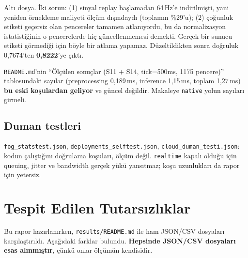 \documentclass[11pt,a4paper]{report}
\newcommand{\ms}{\,ms}
\newcommand{\kod}[1]{\texttt{\small #1}}
\newcommand{\dosya}[1]{\texttt{\footnotesize #1}}
\begin{document}
Altı dosya. İki sorun: (1) sinyal replay başlamadan 64\,Hz'e indirilmişti, yani
yeniden örnekleme maliyeti ölçüm dışındaydı (toplamın \%29'u); (2) çoğunluk
etiketi geçersiz olan pencereler tamamen atlanıyordu, bu da normalizasyon
istatistiğinin o pencerelerde hiç güncellenmemesi demekti. Gerçek bir sunucu
etiketi görmediği için böyle bir atlama yapamaz. Düzeltildikten sonra doğruluk
0{,}7674'ten \textbf{0{,}8222}'ye çıktı.

\begin{uyari}
\dosya{README.md}'nin ``Ölçülen sonuçlar (S11 + S14, tick=500ms, 1175 pencere)''
tablosundaki sayılar (preprocessing 0{,}189\ms, inference 1{,}15\ms, toplam
1{,}27\ms) \textbf{bu eski koşulardan geliyor} ve güncel değildir. Makaleye
\kod{native} yolun sayıları girmeli.
\end{uyari}

\section{Duman testleri}

\dosya{fog\_statstest.json}, \dosya{deployments\_selftest.json},
\dosya{cloud\_duman\_testi.json}: kodun çalıştığını doğrulama koşuları, ölçüm
değil. \kod{realtime} kapalı olduğu için queuing, jitter ve bandwidth gerçek
yükü yansıtmaz; koşu uzunlukları da rapor için yetersiz.

\chapter{Tespit Edilen Tutarsızlıklar}
\label{sec:tutarsizlik}

Bu rapor hazırlanırken, \dosya{results/README.md} ile ham JSON/CSV dosyaları
karşılaştırıldı. Aşağıdaki farklar bulundu. \textbf{Hepsinde JSON/CSV
dosyaları esas alınmıştır}, çünkü onlar ölçümün kendisidir.
\end{document}
